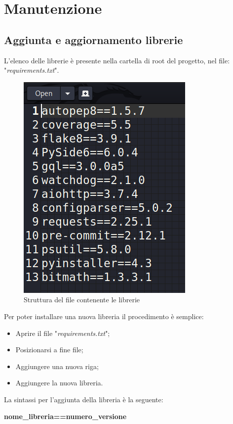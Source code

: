 \section{Manutenzione}

\subsection{Aggiunta e aggiornamento librerie}

L'elenco delle librerie è presente nella cartella di root del progetto, nel file: "\textit{requirements.txt}".

\begin{figure}[H]
    \centering
    \includegraphics[scale = 0.5]{components/img/requirements.png}
    \caption{Struttura del file contenente le librerie}
    \label{fig:Struttura del file contentente le librerie}
\end{figure}
Per poter installare una nuova libreria il procedimento è semplice:
\begin{itemize}
	\item Aprire il file "\textit{requirements.txt}";
	\item Posizionarsi a fine file;
	\item Aggiungere una nuova riga;
	\item Aggiungere la nuova libreria.
\end{itemize}
La sintassi per l'aggiunta della libreria è la seguente:
\newline{} \centerline{\textbf{nome\_libreria==numero\_versione}}\newline{} 
